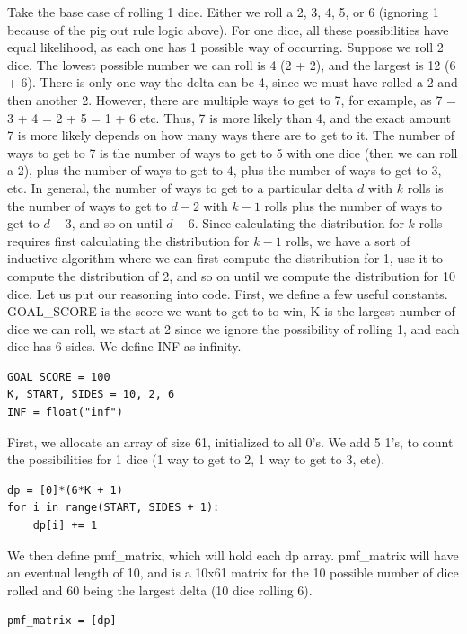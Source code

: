 \documentclass[11pt, oneside]{article}
\begin{document}
Take the base case of rolling 1 dice. Either we roll a 2, 3, 4, 5, or 6
(ignoring 1 because of the pig out rule logic above). For one dice,
all these possibilities have equal likelihood, as each one has 1 possible 
way of occurring. Suppose we roll 2 dice. The lowest possible number 
we can roll is 4 (2 + 2), and the largest is 12 (6 + 6).
There is only one way the delta can be 4, since we must have rolled a 2
and then another 2. However, there are multiple ways to get to 7, for example,
as 7 = 3 + 4 = 2 + 5 = 1 + 6 etc. Thus, 7 is more likely than 4,
and the exact amount 7 is more likely depends on 
how many ways there are to get to it.
The number of ways to get to 7 is the number of ways to get to 5 with one dice
(then we can roll a 2), plus the number of ways to get to 4, plus 
the number of ways to get to 3, etc.
In general, the number of ways to get to a particular delta \( d \) with \( k \)
rolls is the number of ways to get to \( d - 2 \) with \( k - 1 \) rolls
plus the number of ways to get to \( d - 3 \), and so on until \( d - 6 \).
Since calculating the distribution for \( k \) rolls requires first 
calculating the distribution for \( k - 1 \) rolls, we have a sort of 
inductive algorithm where we can first compute the distribution for 1,
use it to compute the distribution of 2, and so on until we compute the 
distribution for 10 dice.
Let us put our reasoning into code.
First, we define a few useful constants.
GOAL\_SCORE is the score we want to get to to win,
K is the largest number of dice we can roll,
we start at 2 since we ignore the possibility of rolling 1,
and each dice has 6 sides.
We define INF as infinity.

\begin{verbatim}
GOAL_SCORE = 100
K, START, SIDES = 10, 2, 6
INF = float("inf")
\end{verbatim}

First, we allocate an array of size 61, initialized to all 0's.
We add 5 1's, to count the possibilities for 1 dice
(1 way to get to 2, 1 way to get to 3, etc).
\begin{verbatim}
dp = [0]*(6*K + 1)
for i in range(START, SIDES + 1):
    dp[i] += 1
\end{verbatim}

We then define pmf\_matrix, which will hold each dp array.
pmf\_matrix will have an eventual length of 10, and is a 10x61 matrix
for the 10 possible number of dice rolled and 60 being the largest delta
(10 dice rolling 6).
\begin{verbatim}
pmf_matrix = [dp]
\end{verbatim}
\end{document}
